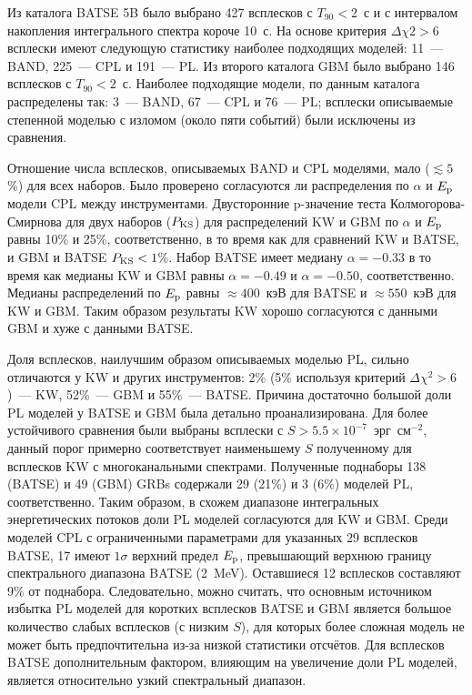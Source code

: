 Из каталога BATSE 5B было выбрано 427 всплесков с $T_{90}<2$~с и с интервалом 
накопления интегрального спектра короче 10~с. На основе критерия $\Delta \chi2>6$
всплески имеют следующую статистику наиболее подходящих моделей:
11~--- BAND, 225~--- CPL и 191~--- PL.
Из второго каталога GBM было выбрано 146 всплесков с $T_{90}<2$~с. Наиболее подходящие модели,
по данным каталога распределены так: 3~--- BAND, 67~--- CPL и 76~--- PL;
всплески описываемые степенной моделью с изломом (около пяти событий) были 
исключены из сравнения.

Отношение числа всплесков, описываемых BAND и CPL моделями, мало ($\lesssim 5$\%)
для всех наборов. Было проверено согласуются ли распределения по $\alpha$ и 
$E_{\mathrm{p}}$ модели CPL между инструментами. Двусторонние p-значение 
теста Колмогорова-Смирнова для двух наборов ($P_{\mathrm{KS}}$) для распределений 
KW и GBM по $\alpha$ и $E_{\mathrm{p}}$ равны 10\% и 25\%, соответственно, в то время 
как для сравнений KW и BATSE, и GBM и BATSE $P_{\mathrm{KS}}<1$\%.
Набор BATSE имеет медиану $\alpha=-0.33$ в то время как медианы KW и GBM равны
$\alpha=-0.49$ и $\alpha=-0.50$, соответственно.
Медианы распределений по $E_{\mathrm{p}}$ равны $\approx 400$~кэВ для BATSE и 
$\approx 550$~кэВ для KW и GBM.
Таким образом результаты KW хорошо согласуются с данными GBM и хуже с данными BATSE.

Доля всплесков, наилучшим образом описываемых моделью PL, сильно отличаются у KW и
других инструментов:
2\% (5\% используя критерий $\Delta \chi^2 > 6$)~--- KW, 52\%~--- GBM и 55\%~--- BATSE.
Причина достаточно большой доли PL моделей у BATSE и GBM была детально проанализирована.
Для более устойчивого сравнения были выбраны всплески с $S>5.5\times 10^{-7}$~эрг~см$^{-2}$,
данный порог примерно соответствует наименьшему $S$ полученному для всплесков KW с многоканальными
спектрами. Полученные поднаборы 138 (BATSE) и 49 (GBM) GRBs содержали 29 (21\%) и 3 (6\%) моделей PL, соответственно. 
Таким образом, в схожем диапазоне интегральных энергетических потоков доли PL моделей
согласуются для KW и GBM.
Среди моделей CPL с ограниченными параметрами для указанных 29 всплесков BATSE,
17 имеют $1\sigma$ верхний предел $E_{\mathrm{p}}$, превышающий верхнюю границу 
спектрального диапазона  BATSE (2~MeV). Оставшиеся 12 всплесков составляют 9\% от поднабора. 
Следовательно, можно считать, что основным источником избытка PL моделей для коротких 
всплесков BATSE и GBM является большое количество слабых всплесков (с низким $S$),
для которых более сложная модель не может быть предпочтительна из-за низкой статистики отсчётов.
Для всплесков BATSE дополнительным фактором, влияющим на увеличение доли PL моделей, 
является относительно узкий спектральный диапазон.

